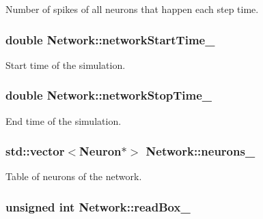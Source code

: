 Number of spikes of all neurons that happen each step time. 

\hypertarget{classNetwork_ad07d3a8419cece935015b1b61c09912b}{
\subsubsection[{network\-Start\-Time\-\_\-}]{\setlength{\rightskip}{0pt plus 5cm}double Network\-::network\-Start\-Time\-\_\-\hspace{0.3cm}{\ttfamily [private]}}}\label{classNetwork_ad07d3a8419cece935015b1b61c09912b}


Start time of the simulation. 

\hypertarget{classNetwork_ad0eb983a5fb38dd9ab4d37db43ea9776}{
\subsubsection[{network\-Stop\-Time\-\_\-}]{\setlength{\rightskip}{0pt plus 5cm}double Network\-::network\-Stop\-Time\-\_\-\hspace{0.3cm}{\ttfamily [private]}}}\label{classNetwork_ad0eb983a5fb38dd9ab4d37db43ea9776}


End time of the simulation. 

\hypertarget{classNetwork_ad5054ddd778795d5ceaac9e6adf050cd}{
\subsubsection[{neurons\-\_\-}]{\setlength{\rightskip}{0pt plus 5cm}std\-::vector$<${\bf Neuron}$\ast$$>$ Network\-::neurons\-\_\-\hspace{0.3cm}{\ttfamily [private]}}}\label{classNetwork_ad5054ddd778795d5ceaac9e6adf050cd}


Table of neurons of the network. 

\hypertarget{classNetwork_a6e1a50329d78f8b7e4b63f6c441a83d0}{
\subsubsection[{read\-Box\-\_\-}]{\setlength{\rightskip}{0pt plus 5cm}unsigned int Network\-::read\-Box\-\_\-\hspace{0.3cm}{\ttfamily [private]}}}\label{classNetwork_a6e1a50329d78f8b7e4b63f6c441a83d0}



